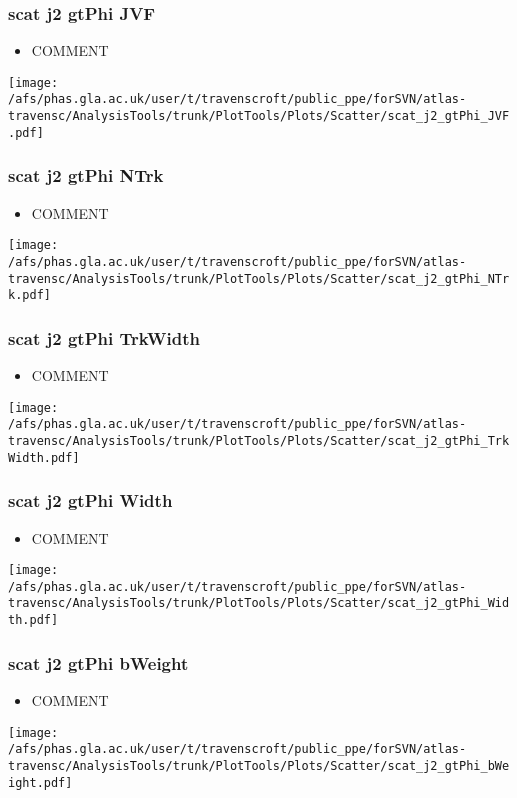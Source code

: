 \documentclass{beamer}
\begin{document}
\begin{frame}
\frametitle{scat j2 gtPhi JVF}
\begin{itemize}
\item COMMENT
\end{itemize}
\begin{center}
\texttt{[image: /afs/phas.gla.ac.uk/user/t/travenscroft/public\_ppe/forSVN/atlas-travensc/AnalysisTools/trunk/PlotTools/Plots/Scatter/scat\_j2\_gtPhi\_JVF.pdf]}
\end{center}
\end{frame}

\begin{frame}
\frametitle{scat j2 gtPhi NTrk}
\begin{itemize}
\item COMMENT
\end{itemize}
\begin{center}
\texttt{[image: /afs/phas.gla.ac.uk/user/t/travenscroft/public\_ppe/forSVN/atlas-travensc/AnalysisTools/trunk/PlotTools/Plots/Scatter/scat\_j2\_gtPhi\_NTrk.pdf]}
\end{center}
\end{frame}

\begin{frame}
\frametitle{scat j2 gtPhi TrkWidth}
\begin{itemize}
\item COMMENT
\end{itemize}
\begin{center}
\texttt{[image: /afs/phas.gla.ac.uk/user/t/travenscroft/public\_ppe/forSVN/atlas-travensc/AnalysisTools/trunk/PlotTools/Plots/Scatter/scat\_j2\_gtPhi\_TrkWidth.pdf]}
\end{center}
\end{frame}

\begin{frame}
\frametitle{scat j2 gtPhi Width}
\begin{itemize}
\item COMMENT
\end{itemize}
\begin{center}
\texttt{[image: /afs/phas.gla.ac.uk/user/t/travenscroft/public\_ppe/forSVN/atlas-travensc/AnalysisTools/trunk/PlotTools/Plots/Scatter/scat\_j2\_gtPhi\_Width.pdf]}
\end{center}
\end{frame}

\begin{frame}
\frametitle{scat j2 gtPhi bWeight}
\begin{itemize}
\item COMMENT
\end{itemize}
\begin{center}
\texttt{[image: /afs/phas.gla.ac.uk/user/t/travenscroft/public\_ppe/forSVN/atlas-travensc/AnalysisTools/trunk/PlotTools/Plots/Scatter/scat\_j2\_gtPhi\_bWeight.pdf]}
\end{center}
\end{frame}
\end{document}
